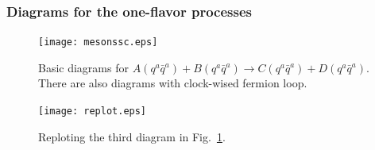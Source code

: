 \documentclass[8pt]{beamer}
\begin{document}
\begin{frame}
	\frametitle{Diagrams for the one-flavor processes}
	\begin{figure}[hbt]
		\begin{center}
			\texttt{[image: mesonssc.eps]}\\
			\caption{Basic diagrams for $A(q^a\bar q^a)+B(q^a\bar q^a)\rightarrow C(q^a\bar q^a)+D(q^a\bar q^a)$.
				There are also diagrams with clock-wised fermion loop.}\label{mesonssc}
		\end{center}
	\end{figure}

	\begin{figure}[hbt]
		\begin{center}
			\texttt{[image: replot.eps]}\\
			\caption{Reploting the third diagram in Fig.~\ref{mesonssc}.}\label{replot}
		\end{center}
	\end{figure}





\end{frame}

\end{document}
